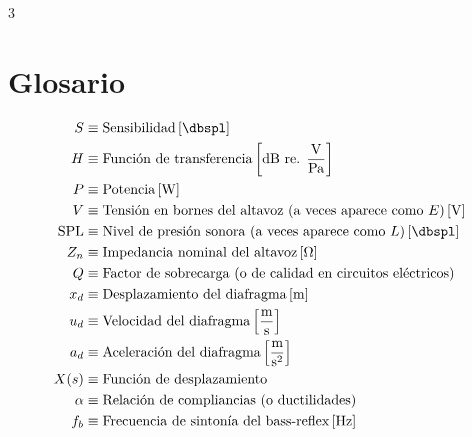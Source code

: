 \documentclass[a4paper, 8pt]{extarticle}
\begin{document}
\setlength{\parskip}{0pt}
\setlength{\parindent}{0pt}
\pagestyle{empty}
\renewcommand{\arraystretch}{1.5}

\begin{multicols}{3}
    \section{Glosario}
    \[
        \begin{alignedat}{2}
            S          & \equiv \text{Sensibilidad}  \left[ \unit{\dbspl} \right]                                                  \\
            H          & \equiv \text{Función de transferencia}  \left[ \unit{\dB} \text{ re. }\unit{\volt\per\pascal} \right]     \\
            P          & \equiv \text{Potencia} \left[ \unit{\watt} \right]                                                        \\
            V          & \equiv \text{Tensión en bornes del altavoz (a veces aparece como } E \text{)} \left[ \unit{\volt} \right] \\
            \text{SPL} & \equiv \text{Nivel de presión sonora (a veces aparece como } L \text{)} \left[ \unit{\dbspl} \right]      \\
            Z_n        & \equiv \text{Impedancia nominal del altavoz} \left[ \unit{\ohm} \right]                                   \\
            Q          & \equiv \text{Factor de sobrecarga (o de calidad en circuitos eléctricos)}                                 \\
            x_d        & \equiv \text{Desplazamiento del diafragma} \left[ \unit{\meter} \right]                                   \\
            u_d        & \equiv \text{Velocidad del diafragma} \left[ \unit{\meter\per\second} \right]                             \\
            a_d        & \equiv \text{Aceleración del diafragma} \left[ \unit{\meter\per\square\second} \right]                    \\
            X(s)       & \equiv \text{Función de desplazamiento}                                                                   \\
            \alpha     & \equiv \text{Relación de compliancias (o ductilidades)}                                                   \\
            f_b        & \equiv \text{Frecuencia de sintonía del bass-reflex} \left[ \unit{\hertz} \right]                         \\
        \end{alignedat}
    \]


\end{multicols}
\end{document}
